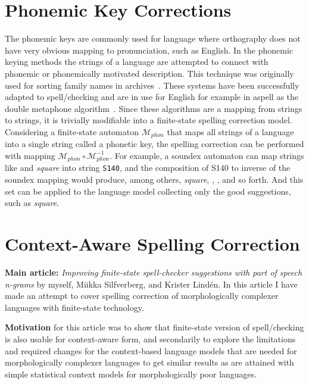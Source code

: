 \documentclass[officiallayout]{unihelcompling}
\newcommand\misspelt{\bgroup\markoverwith
{\textcolor{red}{\lower3.5pt\hbox{\sixly \char58}}}\ULon}
\begin{document}
\section{Phonemic Key Corrections}
\label{sec:phonemic}

The phonemic keys are commonly used for language where orthography does not
have very obvious mapping to pronunciation, such as English. In the phonemic
keying methods the strings of a language are attempted to connect with phonemic
or phonemically motivated description. This technique was originally used for
sorting family names in archives~\citep{russell1918soundex}. These systems have
been successfully adapted to spell\-/checking and are in use for English for
example in aspell as the double metaphone algorithm~\citep{philips2000double}.
Since these algorithms are a mapping from strings to strings, it is trivially
modifiable into a finite-state spelling correction model. Considering a
finite-state automaton $\mathcal{M}_{phon}$ that maps all strings of a language
into a single string called a phonetic key, the spelling correction can be
performed with mapping $\mathcal{M}_{phon} \circ \mathcal{M}_{phon}^{-1}$.
For example, a soundex automaton can map strings like \misspelt{squer} and
\emph{square} into string \texttt{S140}, and the composition of S140 to 
inverse of the soundex mapping would produce, among others, \emph{square},
\misspelt{squer}, \misspelt{sqr}, \misspelt{sqrrr} and so forth. And this set
can be applied to the language model collecting only the good suggestions, such
as \emph{square}.

\section{Context-Aware Spelling Correction}
\label{sec:context}

\textbf{Main article:} \emph{Improving finite-state spell-checker suggestions
with part of speech n-grams} by myself, Miikka Silfverberg, and Krister
Lindén. In this article I have made an attempt to cover spelling correction
of morphologically complexer languages with finite-state technology.

\textbf{Motivation} for this article was to show that finite-state version of
spell\-/checking is also usable for context-aware form, and secondarily to
explore the limitations and required changes for the context-based language
models that are needed for morphologically complexer languages to get similar
results as are attained with simple statistical context models for
morphologically poor languages.
\end{document}
